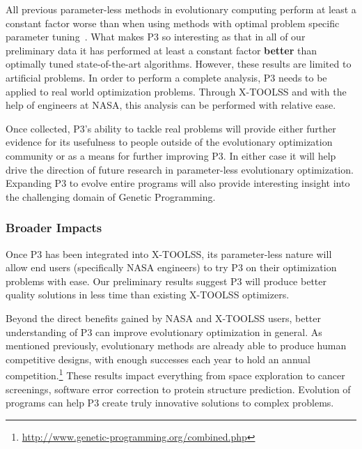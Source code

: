 \documentclass{article}
\begin{document}
All previous parameter-less methods in evolutionary computing perform at least a constant factor
worse than when using methods with optimal problem specific parameter tuning~\cite{pelikan:2004:parameterlesshboa}.
What makes P3 so interesting as that in all of our preliminary data it has performed at
least a constant factor \textbf{better} than optimally tuned state-of-the-art algorithms.
However, these results are limited to artificial problems.  In order to perform a complete analysis,
P3 needs to be applied to real world optimization problems.  Through X-TOOLSS and 
with the help of engineers at NASA, this
analysis can be performed with relative ease.

Once collected, P3's ability to tackle real problems will provide either further evidence for its usefulness
to people outside of the evolutionary optimization community or as a means for further improving P3.
In either case it will help drive the direction of future research in parameter-less evolutionary optimization.
Expanding P3 to evolve entire programs will also provide interesting insight into the challenging domain
of Genetic Programming.

\vspace{-2.5mm}
\subsubsection*{Broader Impacts}
Once P3 has been integrated into X-TOOLSS, its parameter-less nature will allow
end users (specifically NASA engineers) to try P3 on their optimization problems with ease.
Our preliminary results suggest P3 will produce better quality solutions in less time
than existing X-TOOLSS optimizers.

Beyond the direct benefits gained by NASA and X-TOOLSS users, better understanding of P3
can improve evolutionary optimization in general.  As mentioned previously, evolutionary
methods are already able to produce human competitive designs, with enough successes each
year to hold an annual competition.\footnote{\url{http://www.genetic-programming.org/combined.php}}
These results impact everything from space exploration to cancer screenings, software error correction
to protein structure prediction.  Evolution of programs can help P3 create truly innovative solutions to complex problems.


\newpage


\end{document}
